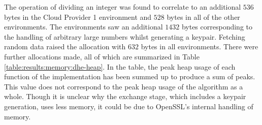 The operation of dividing an integer was found to correlate to an additional $536$ bytes in the Cloud Provider 1 environment and $528$ bytes in all of the other environments. The environments saw an additional $1432$ bytes corresponding to the handling of arbitrary large numbers whilst generating a keypair. Fetching random data raised the allocation with $632$ bytes in all environments. There were further allocations made, all of which are summarized in Table \ref{table:results:memory:dhe-heap}. In the table, the peak heap usage of each function of the implementation has been summed up to produce a sum of peaks. This value does not correspond to the peak heap usage of the algorithm as a whole. Though it is unclear why the exchange stage, which includes a keypair generation, uses less memory, it could be due to OpenSSL's internal handling of memory.

